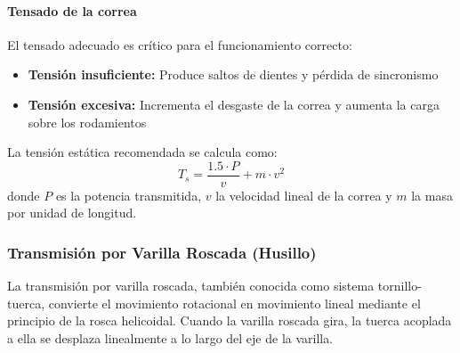 \paragraph{Tensado de la correa}
El tensado adecuado es crítico para el funcionamiento correcto:
\begin{itemize}
    \item \textbf{Tensión insuficiente:} Produce saltos de dientes y pérdida de sincronismo
    \item \textbf{Tensión excesiva:} Incrementa el desgaste de la correa y aumenta la carga sobre los rodamientos
\end{itemize}

La tensión estática recomendada se calcula como:
\begin{equation}
    T_s = \frac{1.5 \cdot P}{v} + m \cdot v^2
\end{equation}
donde $P$ es la potencia transmitida, $v$ la velocidad lineal de la correa y $m$ la masa por unidad de longitud.

\subsubsection{Transmisión por Varilla Roscada (Husillo)}

La transmisión por varilla roscada, también conocida como sistema tornillo-tuerca, convierte el movimiento rotacional en movimiento lineal mediante el principio de la rosca helicoidal. Cuando la varilla roscada gira, la tuerca acoplada a ella se desplaza linealmente a lo largo del eje de la varilla.

